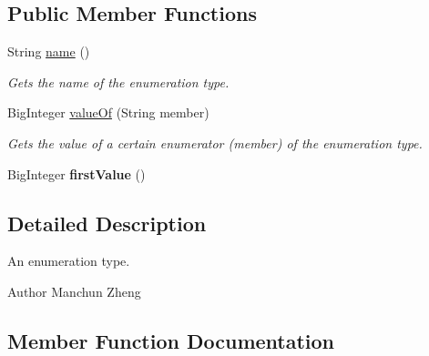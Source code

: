 \subsection*{Public Member Functions}
\begin{DoxyCompactItemize}
\item 
String \hyperlink{interfaceedu_1_1udel_1_1cis_1_1vsl_1_1civl_1_1model_1_1IF_1_1type_1_1CIVLEnumType_acbb2c1ad90f648a4df8658ec1902190c}{name} ()
\begin{DoxyCompactList}\small\item\em Gets the name of the enumeration type. \end{DoxyCompactList}\item 
Big\+Integer \hyperlink{interfaceedu_1_1udel_1_1cis_1_1vsl_1_1civl_1_1model_1_1IF_1_1type_1_1CIVLEnumType_afdad6ec3f007280b878c0682e6d6e554}{value\+Of} (String member)
\begin{DoxyCompactList}\small\item\em Gets the value of a certain enumerator (member) of the enumeration type. \end{DoxyCompactList}\item 
\hypertarget{interfaceedu_1_1udel_1_1cis_1_1vsl_1_1civl_1_1model_1_1IF_1_1type_1_1CIVLEnumType_ae116cd74ff09af128158a006a9f6c2ec}{}Big\+Integer {\bfseries first\+Value} ()\label{interfaceedu_1_1udel_1_1cis_1_1vsl_1_1civl_1_1model_1_1IF_1_1type_1_1CIVLEnumType_ae116cd74ff09af128158a006a9f6c2ec}

\end{DoxyCompactItemize}


\subsection{Detailed Description}
An enumeration type. 

\begin{DoxyAuthor}{Author}
Manchun Zheng 
\end{DoxyAuthor}


\subsection{Member Function Documentation}
\hypertarget{interfaceedu_1_1udel_1_1cis_1_1vsl_1_1civl_1_1model_1_1IF_1_1type_1_1CIVLEnumType_acbb2c1ad90f648a4df8658ec1902190c}{}
